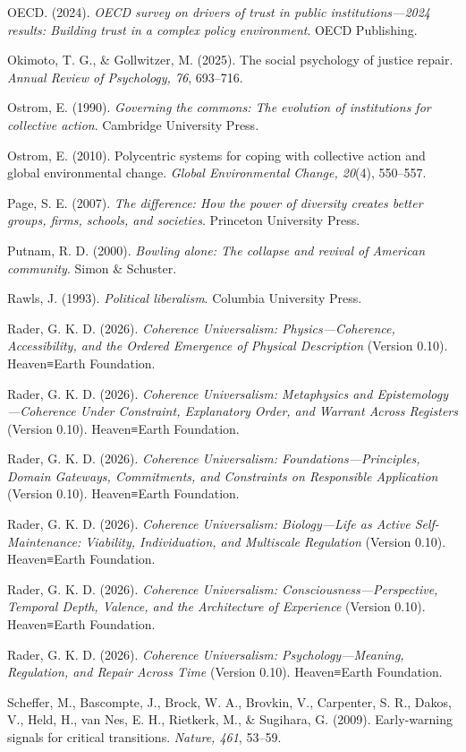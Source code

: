 \documentclass[
  11pt,
]{article}
\begin{document}
OECD. (2024). \emph{OECD survey on drivers of trust in public
institutions---2024 results: Building trust in a complex policy
environment}. OECD Publishing.

Okimoto, T. G., \& Gollwitzer, M. (2025). The social psychology of
justice repair. \emph{Annual Review of Psychology, 76}, 693--716.

Ostrom, E. (1990). \emph{Governing the commons: The evolution of
institutions for collective action}. Cambridge University Press.

Ostrom, E. (2010). Polycentric systems for coping with collective action
and global environmental change. \emph{Global Environmental Change,
20}(4), 550--557.

Page, S. E. (2007). \emph{The difference: How the power of diversity
creates better groups, firms, schools, and societies}. Princeton
University Press.

Putnam, R. D. (2000). \emph{Bowling alone: The collapse and revival of
American community}. Simon \& Schuster.

Rawls, J. (1993). \emph{Political liberalism}. Columbia University
Press.

Rader, G. K. D. (2026). \emph{Coherence Universalism:
Physics---Coherence, Accessibility, and the Ordered Emergence of
Physical Description} (Version 0.10). Heaven≡Earth Foundation.

Rader, G. K. D. (2026). \emph{Coherence Universalism: Metaphysics and
Epistemology---Coherence Under Constraint, Explanatory Order, and
Warrant Across Registers} (Version 0.10). Heaven≡Earth Foundation.

Rader, G. K. D. (2026). \emph{Coherence Universalism:
Foundations---Principles, Domain Gateways, Commitments, and Constraints
on Responsible Application} (Version 0.10). Heaven≡Earth Foundation.

Rader, G. K. D. (2026). \emph{Coherence Universalism: Biology---Life as
Active Self-Maintenance: Viability, Individuation, and Multiscale
Regulation} (Version 0.10). Heaven≡Earth Foundation.

Rader, G. K. D. (2026). \emph{Coherence Universalism:
Consciousness---Perspective, Temporal Depth, Valence, and the
Architecture of Experience} (Version 0.10). Heaven≡Earth Foundation.

Rader, G. K. D. (2026). \emph{Coherence Universalism:
Psychology---Meaning, Regulation, and Repair Across Time} (Version
0.10). Heaven≡Earth Foundation.

Scheffer, M., Bascompte, J., Brock, W. A., Brovkin, V., Carpenter, S.
R., Dakos, V., Held, H., van Nes, E. H., Rietkerk, M., \& Sugihara, G.
(2009). Early-warning signals for critical transitions. \emph{Nature,
461}, 53--59.
\end{document}
